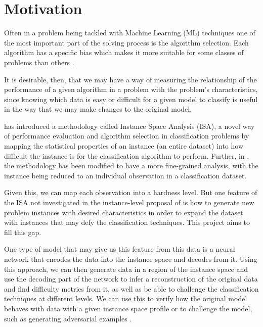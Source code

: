 \section{Motivation}
Often in a problem being tackled with Machine Learning (ML) techniques one of the most important part of the solving process is the algorithm selection. Each algorithm has a specific bias which makes it more suitable for some classes of problems than others \cite{Adam2019}. 

It is desirable, then, that we may have a way of measuring the relationship of the performance of a given algorithm in a problem with the problem's characteristics, since knowing which data is easy or difficult for a given model to classify is useful in the way that we may make changes to the original model.

 has introduced a methodology called Instance Space Analysis (ISA), a novel way of performance evaluation and algorithm selection in classification problems by mapping the statistical properties of an instance (an entire dataset) into how difficult the instance is for the classification algorithm to perform. Further, in , the methodology has been modified to have a more fine-grained analysis, with the instance being reduced to an individual observation in a classification dataset.

Given this, we can map each observation into a hardness level. But one feature of the ISA not investigated in the instance-level proposal of  is how to generate new problem instances with desired characteristics in order to expand the dataset with instances that may defy the classification techniques. This project aims to fill this gap. 

One type of model that may give us this feature from this data is a neural network that encodes the data into the instance space and decodes from it. Using this approach, we can then generate data in a region of the instance space and use the decoding part of the network to infer a reconstruction of the original data and find difficulty metrics from it, as well as be able to challenge the classification techniques at different levels. We can use this to verify how the original model behaves with data with a given instance space profile or to challenge the model, such as generating adversarial examples \cite{Yuan2019}.
%

